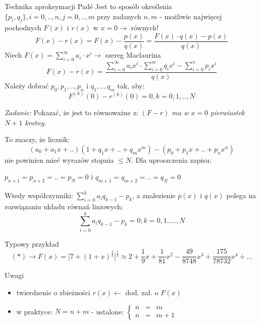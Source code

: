\begin{frame}{Technika aproksymacji Padé}
	Jest to sposób określenia $\{p_i,q_j\}, i = 0,..,n,j = 0,..,m$ przy zadanych $n,m$ - możliwie najwięcej pochodnych $F(x)$ i $r(x)$ w $x=0\rightarrow$ równych!
    $$F(x) - r(x) = F(x) - \frac{p(x)}{q(x)}=\frac{F(x) \cdot q(x) - p(x)}{q(x)}$$
    Niech $F(x) = \sum_{i=0}^{\infty}a_i \cdot x^i \rightarrow$ szereg Maclaurina
    $$F(x) - r(x) = \frac{\sum_{i=0}^{\infty}a_ix^i \cdot \sum_{i=0}^{m}q_ix^i - \sum_{i=0}^{n}p_ix^i}{q(x)}$$
    Należy dobrać $p_0,p_1,..,p_n$ i $q_1,..,q_m$ tak, aby:
    $$F^{(k)}(0)-r^{(k)}(0) = 0, k=0,1,..,N$$
    
\end{frame}
\begin{frame}
	\begin{flushright}
		\textit{Zadanie: } \quad Pokazać, że jest to równoważne z: \newline\textit{$(F-r)$ ma w $x=0$ pierwiastek $N+1$ krotny.}
	\end{flushright}
    To znaczy, że licznik:
    $$(a_0+a_1x+..)(1+q_1x+..+q_mx^m)-(p_0+p_1x+..+p_nx^n)$$
    nie powinien mieć wyrazów stopnia $\leqslant N$. Dla uproszczenia zapisu:
    \begin{center}
    	$p_{n+1} = p_{n+2}=..=p_N=0$ i $q_{m+1} = q_{m+2} = .. =q_N = 0$
    \end{center}
    Wtedy współczynniki: $\sum_{i=0}^{k}a_iq_{k-1}-p_k$, a znalezienie $p(x)$ i $q(x)$ polega na rozwiązaniu układu równań liniowych:
    $$\sum_{i=0}^{k}a_iq_{k-1}-p_k = 0;k=0,1,...,N$$
\end{frame}
\begin{frame}{Typowy przykład}
	$$(*) \rightarrow F(x) = \big[7+(1+x)^{\frac{4}{3}}\big]^{\frac{1}{3}} \approx 2+\frac{1}{9}x+\frac{1}{81}x^2-\frac{49}{8748}x^3+\frac{175}{78732}x^4+\ldots $$
    \begin{block}{Uwagi}
    	\begin{itemize}
    	\item twierdzenie o zbieżności $r(x) \leftarrow$ dod. zał. o $F(x)$
        \item w praktyce: $N = n+m$ - ustalone: $\left\{\begin{array}{ccl}
        	n & = & m \\
            n & = & m+1
        \end{array}\right.$
    	\end{itemize}
    \end{block}
\end{frame}
